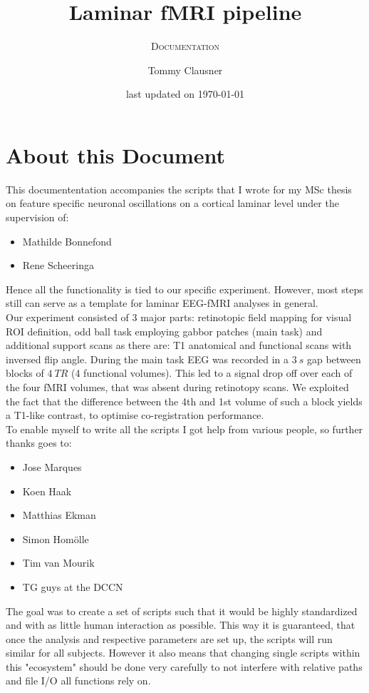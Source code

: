 \documentclass[12pt,a4paper]{scrartcl}
\title{Laminar fMRI pipeline}
\author{Tommy Clausner}
\subtitle{\textsc{Documentation}}
\date{\small{last updated on \today}}
\begin{document}
\begin{titlepage}
\clearpage\maketitle
\thispagestyle{empty}
\end{titlepage}
\tableofcontents
\newpage
\listoffigures
\newpage
\listoftables
\newpage
\section{About this Document}
\label{sec:about}
This documententation accompanies the scripts that I wrote for my MSc thesis on feature specific neuronal oscillations on a cortical laminar level under the supervision of:
\begin{itemize}
  \item Mathilde Bonnefond
  \item Rene Scheeringa
\end{itemize}
Hence all the functionality is tied to our specific experiment. However, most steps still can serve as a template for laminar EEG-fMRI analyses in general.\\
\noindent Our experiment consisted of 3 major parts: retinotopic field mapping for visual ROI definition, odd ball task employing gabbor patches (main task) and additional support scans as there are: T1 anatomical and functional scans with inversed flip angle. During the main task EEG was recorded in a $3~s$ gap between blocks of $4~TR$ (4 functional volumes). This led to a signal drop off over each of the four fMRI volumes, that was absent during retinotopy scans. We exploited the fact that the difference between the 4th and 1st volume of such a block yields a T1-like contrast, to optimise co-registration performance.\\
\noindent To enable myself to write all the scripts I got help from various people, so further thanks goes to:
\begin{itemize}
  \item Jose Marques
  \item Koen Haak
  \item Matthias Ekman
  \item Simon Hom\"olle
  \item Tim van Mourik
  \item TG guys at the DCCN
\end{itemize}
The goal was to create a set of scripts such that it would be highly standardized and with as little human interaction as possible. This way it is guaranteed, that once the analysis and respective parameters are set up, the scripts will run similar for all subjects. However it also means that changing single scripts within this "ecosystem" should be done very carefully to not interfere with relative paths and file I/O all functions rely on.
\end{document}
